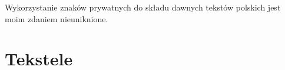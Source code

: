 Wykorzystanie znaków prywatnych do składu dawnych tekstów polskich
jest moim zdaniem nieuniknione.












\section{Tekstele}
\label{sec:tekstele}

